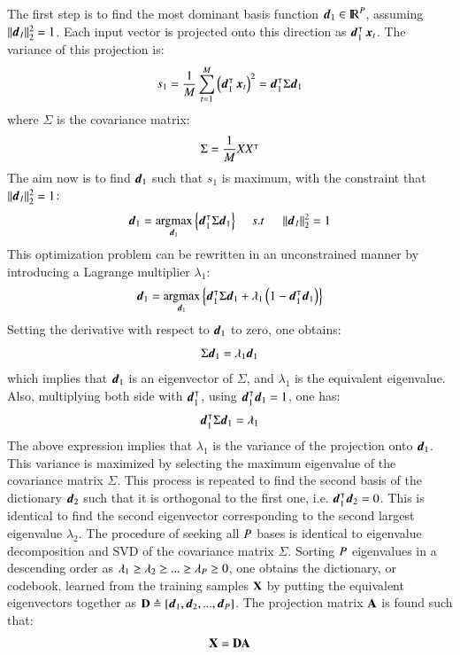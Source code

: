 The first step is to find the most dominant basis function $ \boldsymbol{d}_1  \in {\rm I\!R}^P$, assuming $ \operatorname{\Arrowvert \mathit{\boldsymbol{d}_1} \Arrowvert^2_2 } = 1 $. Each input vector is projected onto this direction as $ \boldsymbol{d}_1^\intercal \operatorname{\boldsymbol{x}}_t $. The variance of this projection is:
\begin{equation}
s_1 = \frac{1}{M} \sum\limits_{t=1}^{M}\left( \boldsymbol{d}_1^\intercal \operatorname{\boldsymbol{x}}_t\right)^2 =  \boldsymbol{d}_1^\intercal \Sigma \boldsymbol{d}_1
\end{equation}
where $ \Sigma  $ is the covariance matrix:
\begin{equation}
\Sigma = \frac{1}{M} X X^\intercal
\end{equation}
The aim now is to find  $ \boldsymbol{d}_1 $ such that $ s_1 $ is maximum, with the constraint that $ \operatorname{\Arrowvert \mathit{\boldsymbol{d}_1} \Arrowvert^2_2 } = 1$:
\begin{equation}
\boldsymbol{d}_1 = \operatorname*{\arg\!\max}_{\boldsymbol{d}_1}{ \left\lbrace \boldsymbol{d}_1^\intercal \Sigma \boldsymbol{d}_1 \right\rbrace } \:\:\:\:\:\: s.t \:\:\:\:\:\: \operatorname{\Arrowvert \mathit{\boldsymbol{d}_1} \Arrowvert^2_2 } = 1
\end{equation}
This optimization problem can be rewritten in an unconstrained manner by introducing a Lagrange multiplier $ \lambda_1 $:
\begin{equation}
\boldsymbol{d}_1 = \operatorname*{\arg\!\max}_{\boldsymbol{d}_1}{ \left\lbrace \boldsymbol{d}_1^\intercal \Sigma \boldsymbol{d}_1 + \lambda_1 \left(1-\boldsymbol{d}_1^\intercal \boldsymbol{d}_1\right) \right\rbrace } 
\end{equation}
Setting the derivative with respect to $ \boldsymbol{d}_1 $ to zero, one obtains:
\begin{equation}
\Sigma \boldsymbol{d}_1 = \lambda_1 \boldsymbol{d}_1
\end{equation}
which implies that $ \boldsymbol{d}_1 $ is an eigenvector of $ \Sigma $, and $ \lambda_1 $ is the equivalent eigenvalue. Also, multiplying both side with $ \boldsymbol{d}_1^\intercal $, using $ \boldsymbol{d}_1^\intercal\boldsymbol{d}_1=1 $, one has:
\begin{equation}
\boldsymbol{d}_1^\intercal \Sigma \boldsymbol{d}_1 = \lambda_1
\end{equation}
The above expression implies that $ \lambda_1 $ is the variance of the projection onto $ \boldsymbol{d}_1 $. This variance is maximized by selecting the maximum eigenvalue of the covariance matrix $ \Sigma $. This process is repeated to find the second basis of the dictionary $ \boldsymbol{d}_2 $ such that it is orthogonal to the first one, i.e. $ \boldsymbol{d}_1^{\intercal}\boldsymbol{d}_2=0 $. This is identical to find the second eigenvector corresponding to the second largest eigenvalue $ \lambda_2 $. The procedure of seeking all $ P $ bases is identical to eigenvalue decomposition and SVD of the covariance matrix $ \Sigma $. Sorting $ P $ eigenvalues in a descending order as $ \lambda_1 \geq \lambda_2 \geq ... \geq \lambda_P \geq 0 $, one obtains the dictionary, or codebook, learned from the training samples $ \mathbf{X} $ by putting the equivalent eigenvectors together as $ \mathbf{D} \triangleq \left[ \boldsymbol{d}_1, \boldsymbol{d}_2, ..., \boldsymbol{d}_P \right] $. The projection matrix $ \mathbf{A} $ is found such that:
\begin{equation}
\mathbf{X} = \mathbf{D} \mathbf{A}
\end{equation}


